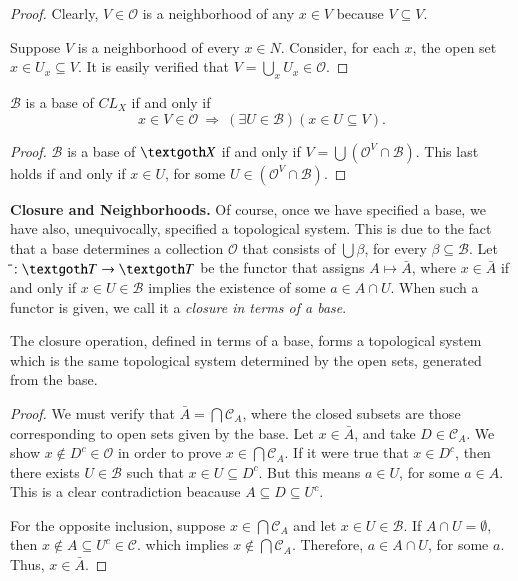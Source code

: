 \documentclass [12pt]{book}
\begin{document}
\begin{proof}Clearly, $V\in\mathcal{O}$ is a neighborhood of any $x\in V$ because $V\subseteq V$.

Suppose $V$ is a neighborhood of every $x\in N$. Consider, for each $x$, the open set $x\in U_{x}\subseteq V$. It is easily verified that $V=\bigcup_x U_x\in\mathcal{O}$.\end{proof}

\begin{theorem}$\mathcal{B}$ is a base of $CL_X$ if and only if $$x\in V\in \mathcal{O}~\Rightarrow~(\exists U\in\mathcal{B})(x\in U\subseteq V).$$\end{theorem}

\begin{proof}$\mathcal{B}$ is a base of $\textgoth X$ if and only if $V=\bigcup(\mathcal{O}^{V}\cap\mathcal{B})$. This last holds if and only if $x\in U$, for some $U\in(\mathcal{O}^V\cap\mathcal{B})$.\end{proof}

\textbf{Closure and Neighborhoods.} Of course, once we have specified a base, we have also, unequivocally, specified a topological system. This is due to the fact that a base determines a collection $\mathcal{O}$ that consists of $\bigcup\beta$, for every $\beta\subseteq\mathcal{B}$. Let $\bar{}:\textgoth T\rightarrow\textgoth T$ be the functor that assigns $A\mapsto\bar A$, where $x\in\bar{A}$ if and only if $x\in U\in\mathcal{B}$ implies the existence of some $a\in A\cap U$. When such a functor is given, we call it a \textit{closure in terms of a base}.

\begin{theorem}The closure operation, defined in terms of a base, forms a topological system which is the same topological system determined by the open sets, generated from the base.\end{theorem}

\begin{proof}We must verify that $\bar{A}=\bigcap\mathcal{C}_A$, where the closed subsets are those corresponding to open sets given by the base. Let $x\in \bar{A}$, and take $D\in\mathcal{C}_A$. We show $x\notin D^c\in\mathcal{O}$ in order to prove $x\in\bigcap\mathcal C_A$. If it were true that $x\in D^c$, then there exists $U\in\mathcal{B}$ such that $x\in U\subseteq D^c$. But this means $a\in U$, for some $a\in A$. This is a clear contradiction beacause $A\subseteq D\subseteq U^c$.

For the opposite inclusion, suppose $x\in\bigcap\mathcal C_A$ and let $x\in U\in\mathcal{B}$. If $A\cap U=\emptyset$, then $x\notin A\subseteq U^c\in\mathcal{C}$. which implies $x\notin\bigcap\mathcal{C}_A$. Therefore, $a\in A\cap U$, for some $a$. Thus, $x\in\bar{A}$.\end{proof}
\end{document}
